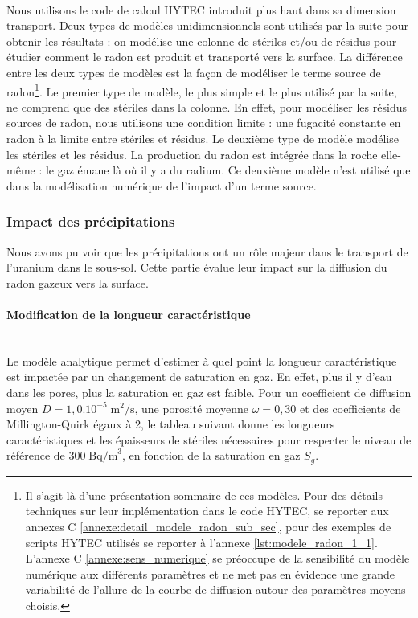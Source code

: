 \documentclass{article}
\begin{document}
\paragraph{} Nous utilisons le code de calcul HYTEC introduit plus haut dans sa dimension transport. Deux types de modèles unidimensionnels sont utilisés par la suite pour obtenir les résultats : on modélise une colonne de stériles et/ou de résidus pour étudier comment le radon est produit et transporté vers la surface. La différence entre les deux types de modèles est la façon de modéliser le terme source de radon\footnote{Il s’agit là d’une présentation sommaire de ces modèles. Pour des détails techniques sur leur implémentation dans le code HYTEC, se reporter aux annexes C \ref{annexe:detail_modele_radon_sub_sec}, pour des exemples de scripts HYTEC utilisés se reporter à l'annexe \ref{lst:modele_radon_1_1}. L'annexe C \ref{annexe:sens_numerique} se préoccupe de la sensibilité du modèle numérique aux différents paramètres et ne met pas en évidence une grande variabilité de l'allure de la courbe de diffusion autour des paramètres moyens choisis.}. Le premier type de modèle, le plus simple et le plus utilisé par la suite, ne comprend que des stériles dans la colonne. En effet, pour modéliser les résidus sources de radon, nous utilisons une condition limite : une fugacité constante en radon à la limite entre stériles et résidus. Le deuxième type de modèle modélise les stériles et les résidus. La production du radon est intégrée dans la roche elle-même : le gaz émane là où il y a du radium. Ce deuxième modèle n'est utilisé que dans la modélisation numérique de l'impact d'un terme source.


\subsubsection{Impact des précipitations}

Nous avons pu voir que les précipitations ont un rôle majeur dans le transport de l'uranium dans le sous-sol. Cette partie évalue leur impact sur la diffusion du radon gazeux vers la surface.

\paragraph{Modification de la longueur caractéristique \\ \\}
Le modèle analytique permet d'estimer à quel point la longueur caractéristique est impactée par un changement de saturation en gaz. En effet, plus il y d’eau dans les pores, plus la saturation en gaz est faible. Pour un coefficient de diffusion moyen $D=1,0.10^{-5} \; \text{m}^2/\text{s}$, une porosité moyenne $\omega=0,30$ et des coefficients de Millington-Quirk égaux à 2, le tableau suivant donne les longueurs caractéristiques et les épaisseurs de stériles nécessaires pour respecter le niveau de référence de $300\; \text{Bq/m}^3$, en fonction de la saturation en gaz $S_g$. 
\end{document}
